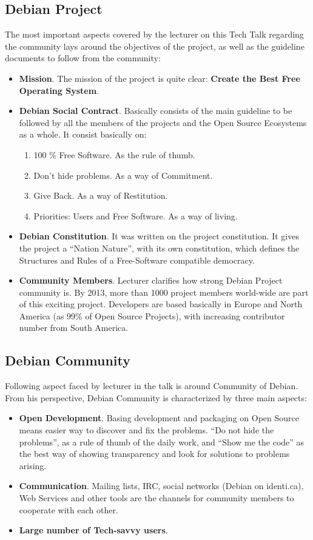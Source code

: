\documentclass[11pt]{article}
\begin{document}
\subsection{Debian Project}
The most important aspects covered by the lecturer on this Tech Talk regarding the community lays around the objectives of the project, as well as the guideline documents to follow from the community:
\begin{itemize}
\item{\textbf{Mission}}. The mission of the project is quite clear: \textbf{Create the Best Free Operating System}.
\item{\textbf{Debian Social Contract}}. Basically consists of the main guideline to be followed by all the members of the projects and the Open Source Ecosystems as a whole. It consist basically on:
\begin{enumerate}\itemsep0pt
\item{100 \% Free Software}. As the rule of thumb.
\item{Don't hide problems}. As a way of Commitment.
\item{Give Back}. As a way of Restitution.
\item{Priorities: Users and Free Software}. As a way of living.
\end{enumerate}
\item{\textbf{Debian Constitution}}. It was written on the project constitution. It gives the project a ``Nation Nature'', with its own constitution, which defines the Structures and Rules of a Free-Software compatible democracy.
\item{\textbf{Community Members}}. Lecturer clarifies how strong Debian Project community is. By 2013, more than 1000 project members world-wide are part of this exciting project. Developers are based basically in Europe and North America (as 99\% of Open Source Projects), with increasing contributor number from South America. 
\end{itemize}

\subsection{Debian Community}
Following aspect faced by lecturer in the talk is around Community of Debian. From his perspective, Debian Community is characterized by three main aspects:
\begin{itemize}
\item{\textbf{Open Development}}. Basing development and packaging on Open Source means easier way to discover and fix the problems. ``Do not hide the problems'', as a rule of thumb of the daily work, and ``Show me the code'' as the best way of showing transparency and look for solutions to problems arising.
\item{\textbf{Communication}}. Mailing lists, IRC, social networks (Debian on identi.ca), Web Services and other tools are the channels for community members to cooperate with each other.
\item{\textbf{Large number of Tech-savvy users}}. 
\end{itemize}
\end{document}
